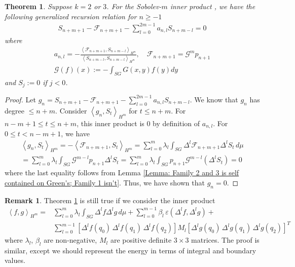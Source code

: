 \documentclass[12pt]{amsart}
\makeatletter
\renewcommand*{\eqref}[1]{%
  \hyperref[{#1}]{\textup{\tagform@{\ref*{#1}}}}%
}
\theoremstyle{plain}
\newtheorem{theorem}{Theorem}[section]
\theoremstyle{definition}
\newtheorem{remark}{Remark}[section]
\newcommand{\inner}[2]{\left \langle #1, #2\right \rangle}
\newcommand{\lap}{\Delta}
\makeatother
\begin{document}
\begin{theorem}\label{th:gen_rec}
Suppose $k=2$ or $3$. For the Sobolev-$m$ inner product \eqref{eq:sobk}, we have the following generalized recursion relation for $n\ge -1$
\begin{gather}
    S_{n+m+1} - \mathcal{F}_{n+m+1} - \sum\limits_{l = 0}^{2m-1}a_{n, l}S_{n+m-l} = 0
\end{gather}
where
\begin{gather}
    a_{n, l} = -\frac{\inner{\mathcal{F}_{n+m+1}}{S_{n+m-l}}_{H^m}}{\inner{S_{n+m-l}}{S_{n+m-l}}_{H^m}}, \quad \mathcal{F}_{n+m+1} = \mathcal{G}^mp_{n+1}\\
    \mathcal{G}(f)(x) := -\int_{SG}G(x,y)f(y)dy
\end{gather}
and $S_j:=0$ if $j<0$.

\end{theorem}
\begin{proof}
Let $g_n = S_{n+m+1} - \mathcal{F}_{n+m+1} - \sum\limits_{l = 0}^{2m-1}a_{n, l}S_{n+m-l}$. We know that $g_n$ has degree $\leq n+m$. Consider $\inner{g_n}{S_t}_{H^m}$ for $t \leq n+m$. For $n-m+1 \leq t \leq n+m$, this inner product is 0 by definition of $a_{n, l}$. For $0\le t < n-m+1$, we have
\begin{align}
\inner{g_n}{S_t}_{H^m} = -\inner{\mathcal{F}_{n+m+1}}{S_t}_{H^m} = \sum\limits_{l = 0}^m \lambda_l\int_{SG}\lap^l \mathcal{F}_{n+m+1}\lap^l S_t\,d\mu\\
=\sum\limits_{l = 0}^m \lambda_l\int_{SG}\mathcal{G}^{m-l}p_{n+1}\lap^l S_t=\sum\limits_{l = 0}^m \lambda_l\int_{SG}p_{n+1}\mathcal{G}^{m-l}(\lap^l S_t)=0
\end{align}
where the last equality follows from Lemma \ref{Lemma: Family 2 and 3 is self contained on Green's; Family 1 isn't}. Thus, we have shown that $g_n = 0$.
\end{proof}
\begin{remark}\label{remark: Other kinds of $H^1$ inner product}
Theorem \ref{th:gen_rec} is still true if we consider the inner product
\begin{align}\label{eq:point mass inner}
\inner fg_{H^m}= 
&\sum\limits_{l = 0}^m \lambda_l\int_{SG}\lap^lf\lap^lg\,d\mu+\sum\limits_{l=0}^{m-1}\beta_l\,\varepsilon(\lap^l f,\lap^l g)+\nonumber\\
&\sum\limits_{l=0}^{m-1
}[\lap ^lf(q_0)\,\lap ^lf(q_1)\,\lap ^lf(q_2)] M_l [\lap ^lg(q_0)\,\lap ^lg(q_1)\,\lap ^lg(q_2)]^T
\end{align}
where 
$\lambda_l$, $\beta_l$ are non-negative, $M_l$ are positive definite $3\times 3$ matrices. The proof is similar, except we should represent the energy in terms of integral and boundary values.\end{remark}
\end{document}
